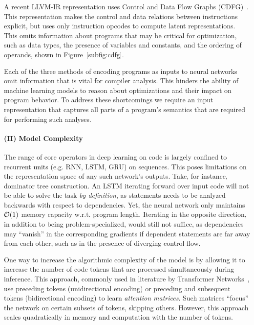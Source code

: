 A recent LLVM-IR representation uses Control and Data Flow Graphs
(CDFG)~\cite{Brauckmann2020}. This representation makes the control
and data relations between instructions explicit, but uses only
instruction opcodes to compute latent representations. This omits
information about programs that may be critical for optimization, such
as data types, the presence of variables and constants, and the
ordering of operands, shown in Figure~\ref{subfig:cdfg}.

Each of the three methods of encoding programs as inputs to neural
networks omit information that is vital for compiler analysis. This
hinders the ability of machine learning models to reason about
optimizations and their impact on program behavior. To address these
shortcomings we require an input representation that captures all
parts of a program's semantics that are required for performing such
analyses.


\paragraph{(II) Model Complexity}

The range of core operators in deep learning on code is largely
confined to recurrent units (e.g. RNN, LSTM, GRU) on sequences. This
poses limitations on the representation space of any such network's
outputs. Take, for instance, dominator tree construction. An LSTM
iterating forward over input code will not be able to solve the task
\emph{by definition}, as statements needs to be analyzed backwards
with respect to dependencies. Yet, the neural network only maintains
$\mathcal{O}(1)$ memory capacity w.r.t. program length. Iterating in the
opposite direction, in addition to being problem-specialized, would
still not suffice, as dependencies may ``vanish'' in the corresponding
gradients if dependent statements are far away from each other, such
as in the presence of diverging control flow.

One way to increase the algorithmic complexity of the model is by
allowing it to increase the number of code tokens that are processed
simultaneously during inference. This approach, commonly used in
literature by Transformer Networks~\cite{Vaswani2017}, use preceding
tokens (unidirectional encoding) or preceding and subsequent tokens
(bidirectional encoding) to learn \textit{attention matrices}. Such
matrices ``focus'' the network on certain subsets of tokens, skipping
others. However, this approach scales quadratically in memory and
computation with the number of tokens.

